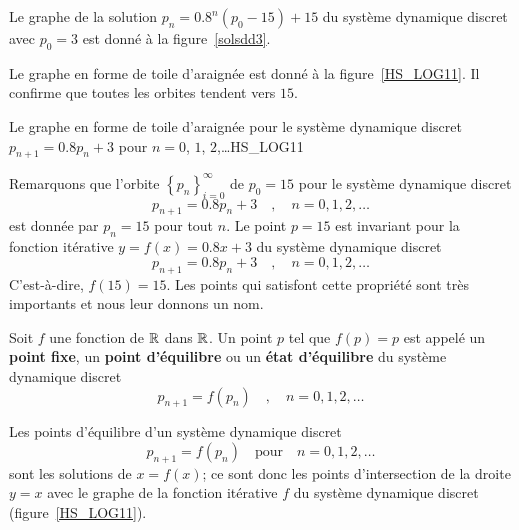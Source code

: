 {\begin{egg}
Le graphe de la solution $p_n = 0.8^n (p_0 - 15) + 15$ du système
dynamique discret avec $p_0=3$ est donné à la figure~\ref{solsdd3}.


Le graphe en forme de toile d'araignée est donné à la
figure~\ref{HS_LOG11}.  Il confirme que toutes les orbites tendent
vers $15$.

{Le graphe en forme de toile d'araignée pour le système dynamique
discret $p_{n+1} = 0.8 p_n + 3$ pour $n=0$, $1$, $2$,\ldots}{HS_LOG11}

Remarquons que l'orbite $\displaystyle \left\{ p_n \right\}_{i=0}^\infty$
de $p_0=15$ pour le système dynamique discret
\[
p_{n+1} = 0.8 p_n + 3 \quad , \quad n=0, 1, 2, \ldots
\]
est donnée par $p_n = 15$ pour tout $n$.  Le point $p=15$ est
invariant pour la fonction itérative $y= f(x) = 0.8x + 3$
du système dynamique discret
\[
p_{n+1} = 0.8 p_n + 3 \quad , \quad n=0, 1, 2, \ldots
\]
C'est-à-dire, $f(15) = 15$.  Les points qui satisfont cette propriété
sont très importants et nous leur donnons un nom.
\label{sol_lin_discr}
\end{egg}

\begin{defn}
Soit $f$ une fonction de $\mathbb{R}$ dans $\mathbb{R}$.  Un point $p$ tel que
$f(p) = p$ est appelé un {\bfseries point fixe}, un
{\bfseries point d'équilibre} ou un {\bfseries état d'équilibre} du
système dynamique discret
\[
p_{n+1} = f(p_n) \quad , \quad n=0, 1, 2, \ldots
\]
\end{defn}

Les points d'équilibre d'un système dynamique discret
\[
p_{n+1} = f(p_n) \quad \text{pour} \quad n=0, 1, 2, \ldots
\]
sont les solutions de $x=f(x)$; ce sont donc les points d'intersection
de la droite $y=x$ avec le graphe de la fonction itérative $f$ du
système dynamique discret (figure~\ref{HS_LOG11}).

}
